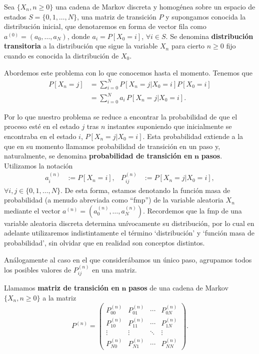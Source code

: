 Sea $\{X_n, n\geq 0\}$ una cadena de Markov discreta y homogénea sobre un espacio de estados $S=\{0,1,\dots,N\}$, una matriz de transición $P$ y supongamos conocida la distribución inicial, que denotaremos en forma de vector fila como $a^{(0)} = (a_0, \dots, a_N)$, donde $a_i = P[X_0 = i]$, $\forall i \in S$. Se denomina \textbf{distribución transitoria} a la distribución que sigue la variable $X_n$ para cierto $n\geq 0$ fijo cuando es conocida la distribución de $X_0$.

Abordemos este problema con lo que conocemos hasta el momento. Tenemos que
\begin{equation}
    \label{eq:distr-trans}
    \begin{split}
        P[X_n = j] &= \sum_{i=0}^N P[X_n=j|X_0 = i]P[X_0=i] \\
        &= \sum_{i=0}^Na_i \, P[X_n=j|X_0 = i].
    \end{split}
\end{equation}

Por lo que nuestro problema se reduce a encontrar la probabilidad de que el proceso esté en el estado $j$ tras $n$ instantes suponiendo que inicialmente se encontraba en el estado $i$, $P[X_n=j|X_0 = i]$. Esta probabilidad extiende a la que en su momento llamamos probabilidad de transición en un paso y, naturalmente, se denomina \textbf{probabilidad de transición en }$\mathbf{n}$ \textbf{pasos}. Utilizamos la notación  
\begin{align*}
    a_i^{(n)} &:= P[X_n=i], & P_{ij}^{(n)} &:= P[X_{n}=j|X_0=i],
\end{align*}
$\forall i,j \in \{0,1,\dots,N\}$. De esta forma, estamos denotando la función masa de probabilidad (a menudo abreviada como ``fmp'') de la variable aleatoria $X_n$ mediante el vector $a^{(n)}=(a_0^{(n)},\dots,a_N^{(n)})$. Recordemos que la fmp de una variable aleatoria discreta determina unívocamente su distribución, por lo cual en adelante utilizaremos indistintamente el término `distribución' y `función masa de probabilidad', sin olvidar que en realidad son conceptos distintos. 

Análogamente al caso en el que considerábamos un único paso, agrupamos todos los posibles valores de $P_{ij}^{(n)}$ en una matriz.

\begin{definicion}
    Llamamos \textbf{matriz de transición en }$\mathbf{n}$ \textbf{pasos} de una cadena de Markov $\{X_n, n\geq 0\}$ a la matriz
    \begin{equation}
        \label{eq:matriz-trans-n}
        P^{(n)}=\begin{pmatrix}
          P_{00}^{(n)} & P_{01}^{(n)} & \cdots & P_{0N}^{(n)} \\
          P_{10}^{(n)} & P_{11}^{(n)} & \cdots & P_{1N}^{(n)} \\
          \vdots & \vdots & \ddots & \vdots \\
          P_{N0}^{(n)} & P_{N1}^{(n)} & \cdots & P_{NN}^{(n)}  
        \end{pmatrix}.
    \end{equation}
\end{definicion}

